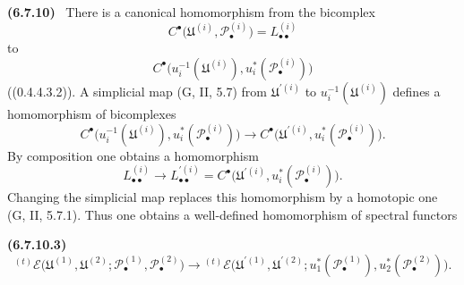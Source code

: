 \documentclass[10pt,oneside]{book}
\newcommand{\sh}[1]{\mathscr{#1}}
\newcommand{\sref}[2][]{(#2)}
\newenvironment{env}[1][]{\par\medskip\noindent\textbf{(#1)}\ }{\par}
\begin{document}
\begin{env}[6.7.10]
There is a canonical homomorphism from the bicomplex
\[
  C^\bullet
  \bigl(
    \mathfrak U^{(i)},\sh P_\bullet^{(i)}
  \bigr)
  =
  L_{\bullet\bullet}^{(i)}
\]
to
\[
  C^\bullet
  \bigl(
    u_i^{-1}(\mathfrak U^{(i)}),
    u_i^*(\sh P_\bullet^{(i)})
  \bigr)
\]
(\sref[0]{0.4.4.3.2}).  A simplicial map
\textnormal{(G, II, 5.7)} from $\mathfrak U^{\prime(i)}$ to
$u_i^{-1}(\mathfrak U^{(i)})$ defines a homomorphism of
bicomplexes
\[
  C^\bullet
  \bigl(
    u_i^{-1}(\mathfrak U^{(i)}),
    u_i^*(\sh P_\bullet^{(i)})
  \bigr)
  \longrightarrow
  C^\bullet
  \bigl(
    \mathfrak U^{\prime(i)},
    u_i^*(\sh P_\bullet^{(i)})
  \bigr).
\]
By composition one obtains a homomorphism
\[
  L_{\bullet\bullet}^{(i)}
  \longrightarrow
  L_{\bullet\bullet}^{\prime(i)}
  =
  C^\bullet
  \bigl(
    \mathfrak U^{\prime(i)},
    u_i^*(\sh P_\bullet^{(i)})
  \bigr).
\]
Changing the simplicial map replaces this homomorphism by a
homotopic one \textnormal{(G, II, 5.7.1)}.  Thus one obtains a
well-defined homomorphism of spectral functors
\begin{env}[6.7.10.3]
\label{III.6.7.10.3}
\[
  {}^{(t)}\sh E
  \bigl(
    \mathfrak U^{(1)},\mathfrak U^{(2)};
    \sh P_\bullet^{(1)},\sh P_\bullet^{(2)}
  \bigr)
  \longrightarrow
  {}^{(t)}\sh E
  \bigl(
    \mathfrak U^{\prime(1)},\mathfrak U^{\prime(2)};
    u_1^*(\sh P_\bullet^{(1)}),
    u_2^*(\sh P_\bullet^{(2)})
  \bigr).
  \tag{6.7.10.3}\label{III.6.7.10.3.eq}
\]
\end{env}


\end{env}
\end{document}

